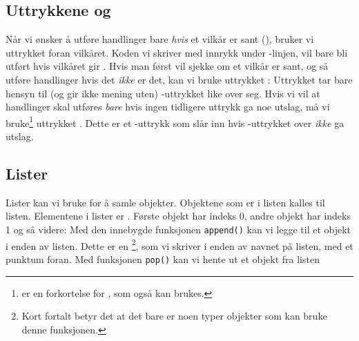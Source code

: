 \subsection{Uttrykkene  og }
Når vi ønsker å utføre handlinger bare \textsl{hvis} et vilkår er sant (), bruker vi uttrykket  foran vilkåret. Koden vi skriver med innrykk under -linjen, vil bare bli utført hvis vilkåret gir . 
Hvis man først vil sjekke om et vilkår er sant, og så utføre handlinger hvis det \textsl{ikke} er det, kan vi bruke uttrykket :
Uttrykket  tar bare hensyn til (og gir ikke mening uten) -uttrykket like over seg. Hvis vi vil at handlinger skal utføres \textsl{bare} hvis ingen tidligere  uttrykk ga noe utslag, må vi bruke\footnote{ er en forkortelse for , som også kan brukes.} uttrykket . Dette er et -uttrykk som slår inn hvis -uttrykket over \textsl{ikke} ga utslag.
\newpage
\subsection{Lister}
Lister kan vi bruke for å samle objekter. Objektene som er i listen kalles  til listen.
Elementene i lister er . Første objekt har indeks 0, andre objekt har indeks 1 og så videre:
Med den innebygde funksjonen \texttt{append()} kan vi legge til et objekt i enden av listen. Dette er en \footnote{Kort fortalt betyr det at det bare er noen typer objekter som kan bruke denne funksjonen.}, som vi skriver i enden av navnet på listen, med et punktum foran.
\newpage
Med funksjonen \texttt{pop()} kan vi hente ut et objekt fra listen
 \vsk


